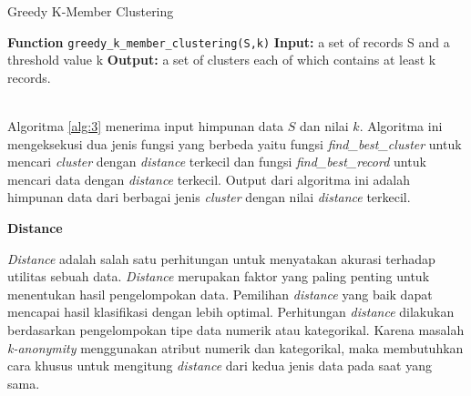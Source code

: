 \documentclass[a4paper,twoside]{article}
\begin{document}
\begin{enumerate}
\begin{tcolorbox}[blanker,width=(\linewidth-0.5cm)]
\begin{algorithm}[H]
  \caption{Greedy K-Member Clustering}		 \label{alg:3}
  \begin{algorithmic}[1]
  \State \textbf{Function} \texttt{greedy\_k\_member\_clustering(S,k)}
  \State \textbf{Input:} a set of records S and a threshold value k
  \State \textbf{Output:} a set of clusters each of which contains at least k records.
  \\
  \EndIf
  \\
  	\EndWhile
  \EndWhile
  \EndWhile
  \end{algorithmic}
\end{algorithm}
\end{tcolorbox}

Algoritma \ref{alg:3} menerima input himpunan data $S$ dan nilai $k$. Algoritma ini mengeksekusi dua jenis fungsi yang berbeda yaitu fungsi \textit{find\_best\_cluster} untuk mencari \textit{cluster} dengan \textit{distance} terkecil dan fungsi \textit{find\_best\_record} untuk mencari data dengan \textit{distance} terkecil. Output dari algoritma ini adalah himpunan data dari berbagai jenis \textit{cluster} dengan nilai \textit{distance} terkecil.
		
\textbf{Distance} 

\textit{Distance} adalah salah satu perhitungan untuk menyatakan akurasi terhadap utilitas sebuah data. \textit{Distance} merupakan faktor yang paling penting untuk menentukan hasil pengelompokan data. Pemilihan \textit{distance} yang baik dapat mencapai hasil klasifikasi dengan lebih optimal. Perhitungan \textit{distance} dilakukan berdasarkan pengelompokan tipe data numerik atau kategorikal. Karena masalah \textit{k-anonymity} menggunakan atribut numerik dan kategorikal, maka membutuhkan cara khusus untuk mengitung \textit{distance} dari kedua jenis data pada saat yang sama. 


\end{enumerate}
\end{document}
